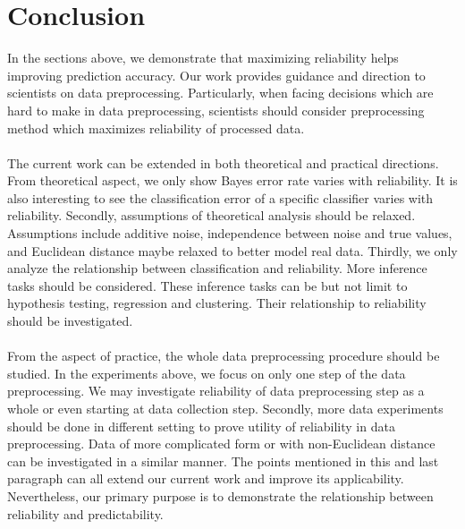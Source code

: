 \documentclass[11pt,journal,compsoc]{IEEEtran}
\begin{document}
\section{Conclusion}
In the sections above, we demonstrate that maximizing reliability helps improving prediction accuracy. Our work provides guidance and direction to scientists on data preprocessing. Particularly, when facing decisions which are hard to make in data preprocessing, scientists should consider preprocessing method which maximizes reliability of processed data.\\
\\
The current work can be extended in both theoretical and practical directions. From theoretical aspect, we only show Bayes error rate varies with reliability. It is also interesting to see the classification error of a specific classifier varies with reliability. Secondly, assumptions of theoretical analysis should be relaxed. Assumptions include additive noise, independence between noise and true values, and Euclidean distance maybe relaxed to better model real data. Thirdly, we only analyze the relationship between classification and reliability. More inference tasks should be considered. These inference tasks can be but not limit to hypothesis testing, regression and clustering. Their relationship to reliability should be investigated.\\
\\ 
From the aspect of practice, the whole data preprocessing procedure should be studied. In the experiments above, we focus on only one step of the data preprocessing. We may investigate reliability of data preprocessing step as a whole or even starting at data collection step. Secondly, more data experiments should be done in different setting to prove utility of reliability in data preprocessing. Data of more complicated form or with non-Euclidean distance can be investigated in a similar manner. The points mentioned in this and last paragraph can all extend our current work and improve its applicability. Nevertheless, our primary purpose is to demonstrate the relationship between reliability and predictability.





\appendices
\end{document}
